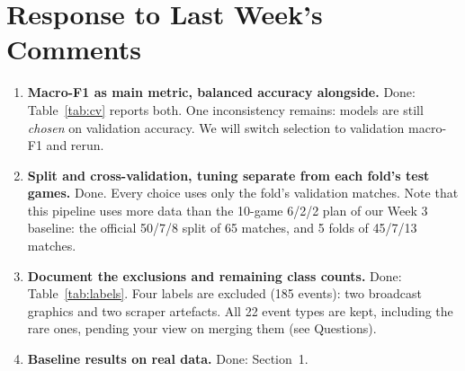 \documentclass[11pt]{article}
\begin{document}
\section*{Response to Last Week's Comments}
\begin{enumerate}[noitemsep]
  \item \textbf{Macro-F1 as main metric, balanced accuracy alongside.} Done: Table~\ref{tab:cv} reports
        both. One inconsistency remains: models are still \emph{chosen} on validation accuracy. We will
        switch selection to validation macro-F1 and rerun.
  \item \textbf{Split and cross-validation, tuning separate from each fold's test games.} Done. Every choice
        uses only the fold's validation matches. Note that this pipeline uses more data than the 10-game
        6/2/2 plan of our Week 3 baseline: the official 50/7/8 split of 65 matches, and 5 folds of
        45/7/13 matches.
  \item \textbf{Document the exclusions and remaining class counts.} Done: Table~\ref{tab:labels}. Four
        labels are excluded (185 events): two broadcast graphics and two scraper artefacts. All 22 event
        types are kept, including the rare ones, pending your view on merging them (see Questions).
  \item \textbf{Baseline results on real data.} Done: Section~1.
\end{enumerate}
\end{document}
